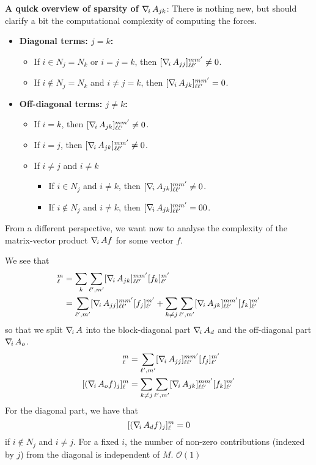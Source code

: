 \noindent
{\bf A quick overview of sparsity of $\nabla_{\!i}\, A_{jk}$}: There is nothing new, but should clarify a bit the computational complexity of computing the forces.
\begin{itemize}
\item {\bf Diagonal terms: $j=k$:}
	\begin{itemize}
		\item If $i\in N_j=N_k$ or $i=j=k$, then $[ \nabla_{\!i}\, A_{jj}]_{\ell \ell'}^{m m'} \neq 0$. 
		\item If $i\not \in N_j=N_k$ and  $i\neq j=k$, then $[ \nabla_{\!i}\, A_{jk}]_{\ell \ell'}^{m m'} = 0$.
	\end{itemize}
\item {\bf Off-diagonal terms: $j\neq k$:}
	\begin{itemize}
		\item If $i=k$, then $[ \nabla_{\!i}\, A_{jk}]_{\ell \ell'}^{m m'} \neq 0$.
		\item If $i=j$, then $[ \nabla_{\!i}\, A_{jk}]_{\ell \ell'}^{m m'} \neq 0$.
		\item If $i\neq j$ and $i\neq k$
		\begin{itemize}
			\item If $i\in N_j$ and $i\neq k$, then $[ \nabla_{\!i}\, A_{jk}]_{\ell \ell'}^{m m'} \neq 0$.
			\item If $i\not\in N_j$ and $i\neq k$, then $[ \nabla_{\!i}\, A_{jk}]_{\ell \ell'}^{m m'} =0 0$.
		\end{itemize}
	\end{itemize}
\end{itemize}
From a different perspective, we want now to analyse the complexity of the matrix-vector product $\nabla_{\!i}\, A f$ for some vector $f$.
%

We see that 
\begin{align*}
	[(\nablai A f)_j]_\ell^m 
	&= \sum_k \sum_{\ell',m'} [\nablai A_{jk}]_{\ell \ell'}^{m m'} [f_k]_{\ell'}^{m'} \\
	&= \sum_{\ell',m'} [\nablai A_{jj}]_{\ell \ell'}^{m m'} [f_j]_{\ell'}^{m'} 
	+ \sum_{k\neq j} \sum_{\ell',m'} [\nablai A_{jk}]_{\ell \ell'}^{m m'} [f_k]_{\ell'}^{m'} 
\end{align*}
so that we split $\nabla_{\!i}\, A$ into the block-diagonal part $\nabla_{\!i}\, A_d$ and the off-diagonal part $\nabla_{\!i}\, A_o$.
\begin{align*}
	[(\nablai A_d f)_j]_\ell^m 
	&= \sum_{\ell',m'} [\nablai A_{jj}]_{\ell \ell'}^{m m'} [f_j]_{\ell'}^{m'} \\
	[(\nablai A_o f)_j]_\ell^m 
	&= \sum_{k\neq j} \sum_{\ell',m'} [\nablai A_{jk}]_{\ell \ell'}^{m m'} [f_k]_{\ell'}^{m'} 
\end{align*}
For the diagonal part, we have that
\[
	[(\nabla_{\!i}\, A_d f)_j]_\ell^m = 0
\]
if $i\not\in N_j$ and $i\neq j$. For a fixed $i$, the number of non-zero contributions (indexed by $j$) from the diagonal is independent of $M$. $\mathcal O(1)$

